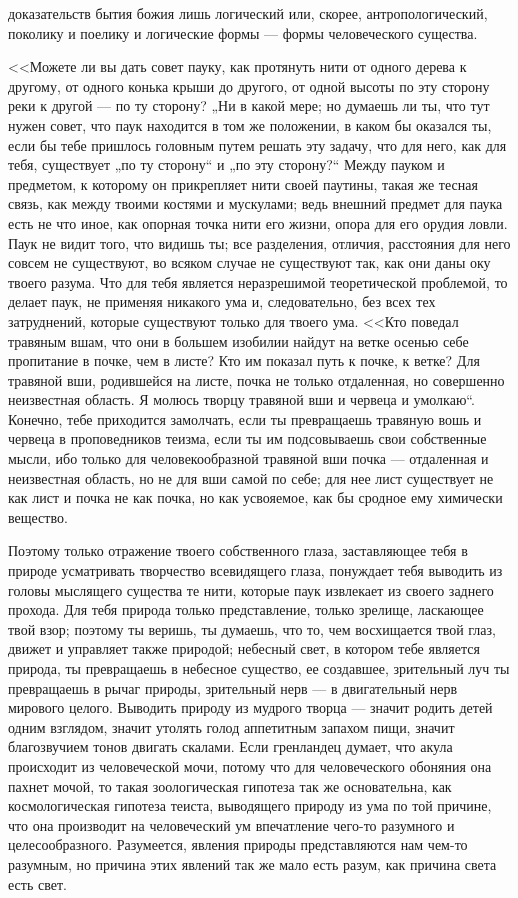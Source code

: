 \documentclass[12pt]{article}
\begin{document}
доказательств бытия божия лишь логический или, скорее, антропологический, поколику и поелику и логические формы --- формы человеческого существа.

<<Можете ли вы дать совет пауку, как протянуть нити от одного дерева к другому, от одного конька крыши до другого, от одной высоты по эту сторону реки к другой --- по ту сторону? „Ни в какой мере; но думаешь ли ты, что тут нужен совет, что паук находится в том же положении, в каком бы оказался ты, если бы тебе пришлось головным путем решать эту задачу, что для него, как для тебя, существует „по ту сторону“ и „по эту сторону?“ Между пауком и предметом, к которому он прикрепляет нити своей паутины, такая же тесная связь, как между твоими костями и мускулами; ведь внешний предмет для паука есть не что иное, как опорная точка нити его жизни, опора для его орудия ловли. Паук не видит того, что видишь ты; все разделения, отличия, расстояния для него совсем не существуют, во всяком случае не существуют так, как они даны оку твоего разума. Что для тебя является неразрешимой теоретической проблемой, то делает паук, не применяя никакого ума и, следовательно, без всех тех затруднений, которые существуют только для твоего ума. <<Кто поведал травяным вшам, что они в большем изобилии найдут на ветке осенью себе пропитание в почке, чем в листе? Кто им показал путь к почке, к ветке? Для травяной вши, родившейся на листе, почка не только отдаленная, но совершенно неизвестная область. Я молюсь творцу травяной вши и червеца и умолкаю“. Конечно, тебе приходится замолчать, если ты превращаешь травяную вошь и червеца в проповедников теизма, если ты им подсовываешь свои собственные мысли, ибо только для человекообразной травяной вши почка --- отдаленная и неизвестная область, но не для вши самой по себе; для нее лист существует не как лист и почка не как почка, но как усвояемое, как бы сродное ему химически вещество.

Поэтому только отражение твоего собственного глаза, заставляющее тебя в природе усматривать творчество всевидящего глаза, понуждает тебя выводить из головы мыслящего существа те нити, которые паук извлекает из своего заднего прохода. Для тебя природа только представление, только зрелище, ласкающее твой взор; поэтому ты веришь, ты думаешь, что то, чем восхищается твой глаз, движет и управляет также природой; небесный свет, в котором тебе является природа, ты превращаешь в небесное существо, ее создавшее, зрительный луч ты превращаешь в рычаг природы, зрительный нерв --- в двигательный нерв мирового целого. Выводить природу из мудрого творца --- значит родить детей одним взглядом, значит утолять голод аппетитным запахом пищи, значит благозвучием тонов двигать скалами. Если гренландец думает, что акула происходит из человеческой мочи, потому что для человеческого обоняния она пахнет мочой, то такая зоологическая гипотеза так же основательна, как космологическая гипотеза теиста, выводящего природу из ума по той причине, что она производит на человеческий ум впечатление чего-то разумного и целесообразного. Разумеется, явления природы представляются нам чем-то разумным, но причина этих явлений так же мало есть разум, как причина света есть свет.
\end{document}

